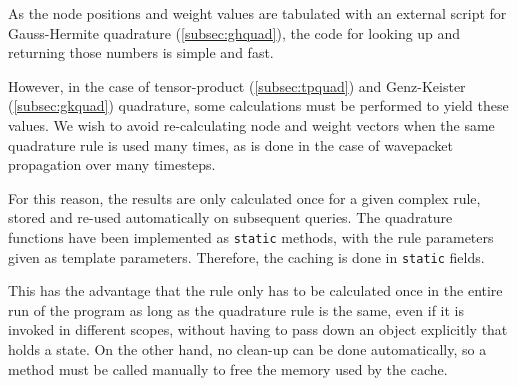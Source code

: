 As the node positions and weight values are tabulated with an external script
for Gauss-Hermite quadrature (\ref{subsec:ghquad}), the code for looking up and
returning those numbers is simple and fast.

However, in the case of tensor-product (\ref{subsec:tpquad}) and Genz-Keister
(\ref{subsec:gkquad}) quadrature, some calculations must be performed to yield
these values.
We wish to avoid re-calculating node and weight vectors when the same quadrature
rule is used many times, as is done in the case of wavepacket propagation over
many timesteps.

For this reason, the results are only calculated once for a given complex
rule, stored and re-used automatically on subsequent queries.
The quadrature functions have been implemented as \texttt{static} methods, with
the rule parameters given as template parameters.
Therefore, the caching is done in \texttt{static} fields.

This has the advantage that the rule only has to be calculated once in the
entire run of the program as long as the quadrature rule is the same, even if it
is invoked in different scopes, without having to pass down an object explicitly
that holds a state.
On the other hand, no clean-up can be done automatically, so a method must be
called manually to free the memory used by the cache.
